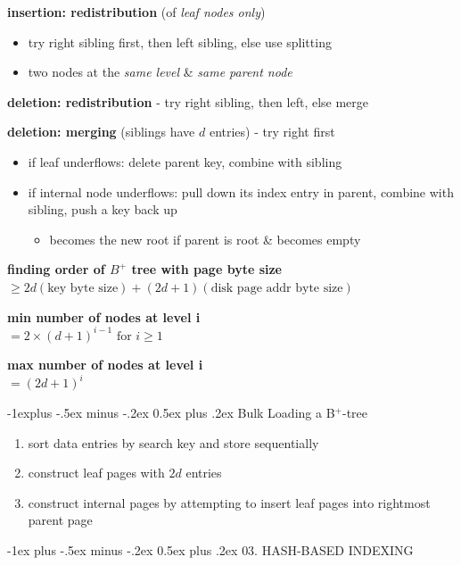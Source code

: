\documentclass[10pt, landscape]{article}
\makeatletter
\renewcommand{\section}{\@startsection{section}{1}{0mm}%
  {-1ex plus -.5ex minus -.2ex}%
  {0.5ex plus .2ex}%
{\normalfont\large\bfseries}}
\renewcommand{\subsection}{\@startsection{subsection}{2}{0mm}%
  {-1explus -.5ex minus -.2ex}%
  {0.5ex plus .2ex}%
{\normalfont\normalsize\bfseries}}
\makeatother
\begin{document}
\begin{multicols*}{4}
  \textbf{insertion: redistribution} (of \textit{leaf nodes only})
  \begin{itemize}
    \item try right sibling first, then left sibling, else use splitting
    \item {} two nodes at the \textit{same level} \& \textit{same parent node}
  \end{itemize}

  \textbf{deletion: redistribution} - try right sibling, then left, else merge

  \textbf{deletion: merging} (siblings have $d$ entries) - try right first 
  \begin{itemize}
    \item if leaf underflows: delete parent key, combine with sibling
    \item if internal node underflows: pull down its index entry in parent, combine with sibling, push a key back up
      \begin{itemize}
        \item becomes the new root if parent is root \& becomes empty
      \end{itemize}
  \end{itemize}

  \textbf{finding order of $B^+$ tree with page byte size} \\$\geq 2d(\text{key byte size}) + (2d+1)(\text{disk page addr byte size})$

  \textbf{min number of nodes at level i} \\$= 2 \times (d+1)^{i-1} \text{ for } i \geq 1$

  \textbf{max number of nodes at level i} \\$= (2d+1)^i$

  \subsection{Bulk Loading a B$^+$-tree}

  \begin{enumerate}
    \item sort data entries by search key and store sequentially
    \item construct leaf pages with $2d$ entries
    \item construct internal pages by attempting to insert leaf pages into rightmost parent page
  \end{enumerate}

  \section{03. HASH-BASED INDEXING}


\end{multicols*}
\end{document}
